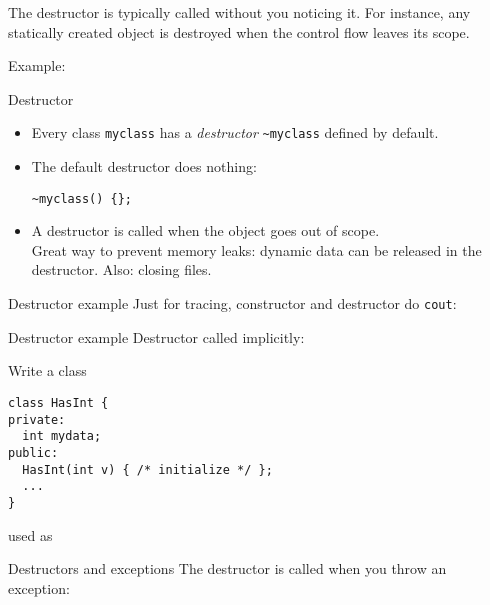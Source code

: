 The destructor is typically called without you noticing it. For
instance, any statically created object is destroyed when the control
flow leaves its scope.

Example:
%

\begin{slide}{Destructor}
  \label{sl:class-destruct}
  \begin{itemize}
  \item Every class \lstinline{myclass} has a \emph{destructor} \lstinline{~myclass}
    defined by default.
  \item The default destructor does nothing:
\begin{lstlisting}
~myclass() {};
\end{lstlisting}
\item A destructor is called when the object goes out of scope.\\
  Great way to prevent memory leaks: dynamic data can be released
  in the destructor. Also: closing files.
\end{itemize}
\end{slide}

\begin{slide}{Destructor example}
  \label{sl:class-destruct-ex1}
  Just for tracing, constructor and destructor do \lstinline{cout}:
  \lstset{style=snippetcode}
\end{slide}

\begin{slide}{Destructor example}
  \label{sl:class-destruct-ex2}
  Destructor called implicitly:
\end{slide}

\begin{exercise}
  \label{ex:destruct-trace}
  Write a class
\begin{lstlisting}
class HasInt {
private:
  int mydata;
public:
  HasInt(int v) { /* initialize */ };
  ...
}
\end{lstlisting}
used as
%
\end{exercise}

\begin{block}{Destructors and exceptions}
  \label{sl:exceptobj}
  The destructor is called when you throw an exception:
\end{block}

